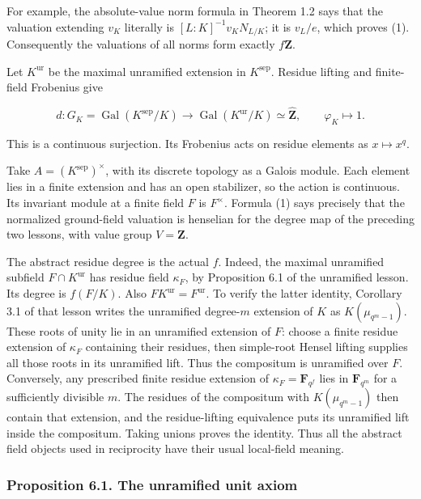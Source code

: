 \documentclass[11pt,a4paper]{article}
\begin{document}
For example, the absolute-value norm formula in Theorem 1.2 says that
the valuation extending \(v_K\) literally is \([L:K]^{-1}v_KN_{L/K}\);
it is \(v_L/e\), which proves (1). Consequently the valuations of all
norms form exactly \(f\mathbf Z\).

Let \(K^{\mathrm{ur}}\) be the maximal unramified extension in
\(K^{\mathrm{sep}}\). Residue lifting and finite-field Frobenius give

\[
d:G_K=\operatorname{Gal}(K^{\mathrm{sep}}/K)
\longrightarrow\operatorname{Gal}(K^{\mathrm{ur}}/K)
\simeq\widehat{\mathbf Z},
\qquad \varphi_K\longmapsto1.
\tag{2}
\]

This is a continuous surjection. Its Frobenius acts on residue elements
as \(x\mapsto x^q\).

Take \(A=(K^{\mathrm{sep}})^\times\), with its discrete topology as a
Galois module. Each element lies in a finite extension and has an open
stabilizer, so the action is continuous. Its invariant module at a
finite field \(F\) is \(F^\times\). Formula (1) says precisely that the
normalized ground-field valuation is henselian for the degree map of the
preceding two lessons, with value group \(V=\mathbf Z\).

The abstract residue degree is the actual \(f\). Indeed, the maximal
unramified subfield \(F\cap K^{\mathrm{ur}}\) has residue field
\(\kappa_F\), by Proposition 6.1 of the unramified lesson. Its degree is
\(f(F/K)\). Also \(FK^{\mathrm{ur}}=F^{\mathrm{ur}}\). To verify the
latter identity, Corollary 3.1 of that lesson writes the unramified
degree-\(m\) extension of \(K\) as \(K(\mu_{q^m-1})\). These roots of
unity lie in an unramified extension of \(F\): choose a finite residue
extension of \(\kappa_F\) containing their residues, then simple-root
Hensel lifting supplies all those roots in its unramified lift. Thus the
compositum is unramified over \(F\). Conversely, any prescribed finite
residue extension of \(\kappa_F=\mathbf F_{q^f}\) lies in
\(\mathbf F_{q^m}\) for a sufficiently divisible \(m\). The residues of
the compositum with \(K(\mu_{q^m-1})\) then contain that extension, and
the residue-lifting equivalence puts its unramified lift inside the
compositum. Taking unions proves the identity. Thus all the abstract
field objects used in reciprocity have their usual local-field meaning.

\subsubsection{Proposition 6.1. The unramified unit
axiom}\label{proposition-6.1.-the-unramified-unit-axiom}
\end{document}

